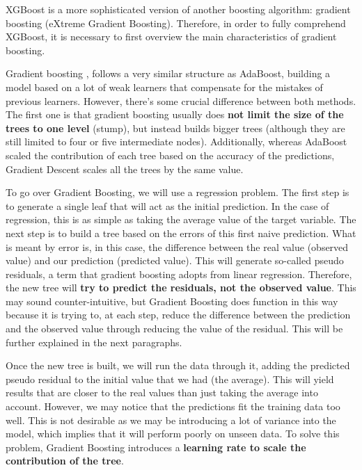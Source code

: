 \documentclass{article}
\begin{document}
XGBoost is a more sophisticated version of another boosting algorithm: gradient boosting (eXtreme Gradient Boosting). Therefore, in order to fully comprehend XGBoost, it is necessary to first overview the main characteristics of gradient boosting.

Gradient boosting \textbf{\cite{Vidhya3}}, \textbf{\cite{youtube2}} follows a very similar structure as AdaBoost, building a model based on a lot of weak learners that compensate for the mistakes of previous learners. However, there’s some crucial difference between both methods. The first one is that gradient boosting usually does \textbf{not limit the size of the trees to one level} (stump), but instead builds bigger trees (although they are still limited to four or five intermediate nodes). Additionally, whereas AdaBoost scaled the contribution of each tree based on the accuracy of the predictions, Gradient Descent scales all the trees by the same value.

To go over Gradient Boosting, we will use a regression problem. The first step is to generate a single leaf that will act as the initial prediction. In the case of regression, this is as simple as taking the average value of the target variable. The next step is to build a tree based on the errors of this first naive prediction. What is meant by error is, in this case, the difference between the real value (observed value) and our prediction (predicted value). This will generate so-called pseudo residuals, a term that gradient boosting adopts from linear regression. Therefore, the new tree will \textbf{try to predict the residuals, not the observed value}. This may sound counter-intuitive, but Gradient Boosting does function in this way because it is trying to, at each step, reduce the difference between the prediction and the observed value through reducing the value of the residual. This will be further explained in the next paragraphs.

Once the new tree is built, we will run the data through it, adding the predicted pseudo residual to the initial value that we had (the average). This will yield results that are closer to the real values than just taking the average into account. However, we may notice that the predictions fit the training data too well. This is not desirable as we may be introducing a lot of variance into the model, which implies that it will perform poorly on unseen data. To solve this problem, Gradient Boosting introduces a \textbf{learning rate to scale the contribution of the tree}.
\end{document}
